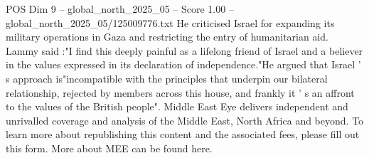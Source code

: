 \begin{textsample}{POS Dim 9 – global\_north\_2025\_05 – Score 1.00 – global\_north\_2025\_05/125009776.txt}
He criticised Israel for expanding its military operations in Gaza and restricting the entry of humanitarian aid.
Lammy said :"I find this deeply painful as a lifelong friend of Israel and a believer in the values expressed in its declaration of independence."He argued that Israel ' s approach is"incompatible with the principles that underpin our bilateral relationship, rejected by members across this house, and frankly it ' s an affront to the values of the British people".
Middle East Eye delivers independent and unrivalled coverage and analysis of the Middle East, North Africa and beyond.
To learn more about republishing this content and the associated fees, please fill out this form.
More about MEE can be found here.

\end{textsample}
